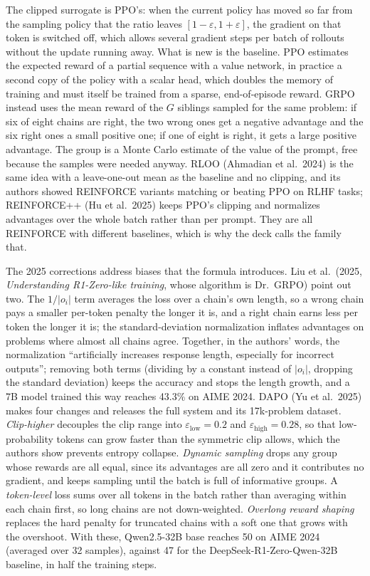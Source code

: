 \documentclass[11pt,letterpaper]{article}
\newcommand{\paper}[1]{\textit{#1}}
\begin{document}
The clipped surrogate is PPO's: when the current policy has moved so far from the sampling policy that the ratio leaves $[1-\varepsilon,1+\varepsilon]$, the gradient on that token is switched off, which allows several gradient steps per batch of rollouts without the update running away. What is new is the baseline. PPO estimates the expected reward of a partial sequence with a value network, in practice a second copy of the policy with a scalar head, which doubles the memory of training and must itself be trained from a sparse, end-of-episode reward. GRPO instead uses the mean reward of the $G$ siblings sampled for the same problem: if six of eight chains are right, the two wrong ones get a negative advantage and the six right ones a small positive one; if one of eight is right, it gets a large positive advantage. The group is a Monte Carlo estimate of the value of the prompt, free because the samples were needed anyway. RLOO (Ahmadian et al.\ 2024) is the same idea with a leave-one-out mean as the baseline and no clipping, and its authors showed REINFORCE variants matching or beating PPO on RLHF tasks; REINFORCE++ (Hu et al.\ 2025) keeps PPO's clipping and normalizes advantages over the whole batch rather than per prompt. They are all REINFORCE with different baselines, which is why the deck calls the family that.

The 2025 corrections address biases that the formula introduces. Liu et al.\ (2025, \paper{Understanding R1-Zero-like training}, whose algorithm is Dr.\ GRPO) point out two. The $1/|o_i|$ term averages the loss over a chain's own length, so a wrong chain pays a smaller per-token penalty the longer it is, and a right chain earns less per token the longer it is; the standard-deviation normalization inflates advantages on problems where almost all chains agree. Together, in the authors' words, the normalization ``artificially increases response length, especially for incorrect outputs''; removing both terms (dividing by a constant instead of $|o_i|$, dropping the standard deviation) keeps the accuracy and stops the length growth, and a 7B model trained this way reaches 43.3\% on AIME 2024. DAPO (Yu et al.\ 2025) makes four changes and releases the full system and its 17k-problem dataset. \emph{Clip-higher} decouples the clip range into $\varepsilon_{\mathrm{low}}=0.2$ and $\varepsilon_{\mathrm{high}}=0.28$, so that low-probability tokens can grow faster than the symmetric clip allows, which the authors show prevents entropy collapse. \emph{Dynamic sampling} drops any group whose rewards are all equal, since its advantages are all zero and it contributes no gradient, and keeps sampling until the batch is full of informative groups. A \emph{token-level} loss sums over all tokens in the batch rather than averaging within each chain first, so long chains are not down-weighted. \emph{Overlong reward shaping} replaces the hard penalty for truncated chains with a soft one that grows with the overshoot. With these, Qwen2.5-32B base reaches 50 on AIME 2024 (averaged over 32 samples), against 47 for the DeepSeek-R1-Zero-Qwen-32B baseline, in half the training steps.
\end{document}
